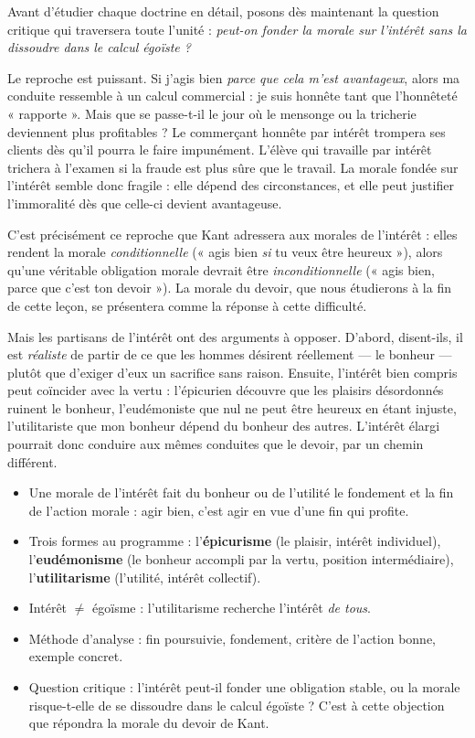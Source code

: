 \documentclass[11pt]{article}
\newcommand{\cle}[1]{{\popxbold\color{popdark}#1}}
\begin{document}
Avant d'étudier chaque doctrine en détail, posons dès maintenant la question critique qui traversera toute l'unité : \emph{peut-on fonder la morale sur l'intérêt sans la dissoudre dans le calcul égoïste ?}

Le reproche est puissant. Si j'agis bien \emph{parce que cela m'est avantageux}, alors ma conduite ressemble à un calcul commercial : je suis honnête tant que l'honnêteté « rapporte ». Mais que se passe-t-il le jour où le mensonge ou la tricherie deviennent plus profitables ? Le commerçant honnête par intérêt trompera ses clients dès qu'il pourra le faire impunément. L'élève qui travaille par intérêt trichera à l'examen si la fraude est plus sûre que le travail. La morale fondée sur l'intérêt semble donc fragile : elle dépend des circonstances, et elle peut justifier l'immoralité dès que celle-ci devient avantageuse.

C'est précisément ce reproche que Kant adressera aux morales de l'intérêt : elles rendent la morale \emph{conditionnelle} (« agis bien \emph{si} tu veux être heureux »), alors qu'une véritable obligation morale devrait être \emph{inconditionnelle} (« agis bien, parce que c'est ton devoir »). La morale du devoir, que nous étudierons à la fin de cette leçon, se présentera comme la réponse à cette difficulté.

Mais les partisans de l'intérêt ont des arguments à opposer. D'abord, disent-ils, il est \emph{réaliste} de partir de ce que les hommes désirent réellement — le bonheur — plutôt que d'exiger d'eux un sacrifice sans raison. Ensuite, l'intérêt bien compris peut coïncider avec la vertu : l'épicurien découvre que les plaisirs désordonnés ruinent le bonheur, l'eudémoniste que nul ne peut être heureux en étant injuste, l'utilitariste que mon bonheur dépend du bonheur des autres. L'intérêt élargi pourrait donc conduire aux mêmes conduites que le devoir, par un chemin différent.

\begin{aretenir}
\begin{itemize}
\item Une \cle{morale de l'intérêt} fait du bonheur ou de l'utilité le fondement et la fin de l'action morale : agir bien, c'est agir en vue d'une fin qui profite.
\item Trois formes au programme : l'\textbf{épicurisme} (le plaisir, intérêt individuel), l'\textbf{eudémonisme} (le bonheur accompli par la vertu, position intermédiaire), l'\textbf{utilitarisme} (l'utilité, intérêt collectif).
\item Intérêt $\neq$ égoïsme : l'utilitarisme recherche l'intérêt \emph{de tous}.
\item Méthode d'analyse : fin poursuivie, fondement, critère de l'action bonne, exemple concret.
\item Question critique : l'intérêt peut-il fonder une obligation stable, ou la morale risque-t-elle de se dissoudre dans le calcul égoïste ? C'est à cette objection que répondra la morale du devoir de Kant.
\end{itemize}
\end{aretenir}
\end{document}
